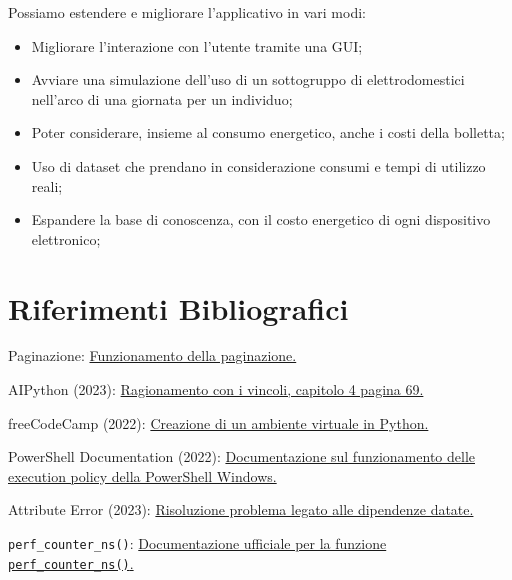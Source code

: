 \documentclass[12pt, letterpaper]{article}
\begin{document}
\noindent Possiamo estendere e migliorare l'applicativo in vari modi:
\begin{itemize}
      \item Migliorare l'interazione con l'utente tramite una GUI;
      \item Avviare una simulazione dell'uso di un sottogruppo di elettrodomestici
            nell'arco di una giornata per un individuo;
      \item Poter considerare, insieme al consumo energetico, anche i costi della bolletta;
      \item Uso di dataset che prendano in considerazione consumi e tempi di utilizzo reali;
      \item Espandere la base di conoscenza, con il costo energetico di ogni dispositivo elettronico;
\end{itemize}

\section{Riferimenti Bibliografici}

\begin{thebibliography}{100}
      Paginazione: \href{https://www.educative.io/answers/what-is-pagination}{
            Funzionamento della paginazione.
      }

      AIPython (2023): \href{https://artint.info/AIPython/aipython/aipython.pdf}{
            Ragionamento con i vincoli, capitolo 4 pagina 69.
      }

      freeCodeCamp (2022):  \href{https://www.freecodecamp.org/news/how-to-setup-virtual-environments-in-python/}{
            Creazione di un ambiente virtuale in Python.
      }

      PowerShell Documentation (2022):
      \href{https://learn.microsoft.com/en-gb/powershell/module/microsoft.powershell.core/about/about_execution_policies?view=powershell-7.4}{
            Documentazione sul funzionamento delle execution policy della PowerShell Windows.
      }

      Attribute Error (2023): \href{https://stackoverflow.com/questions/70749690/attributeerror-module-collections-has-no-attribute-mapping}{
            Risoluzione problema legato alle dipendenze datate.
      }

      \lstinline|perf_counter_ns()|: \href{https://docs.python.org/3/library/time.html#time.perf_counter_ns}{
            Documentazione ufficiale per la funzione \lstinline|perf_counter_ns()|.
      }
\end{thebibliography}
\end{document}
